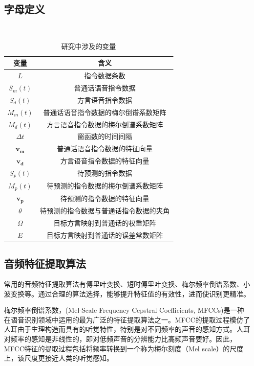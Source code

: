 \documentclass[lang=cn,cite=super]{elegantpaper}
\begin{document}
\subsection{字母定义}
\begin{table}[h]
    \caption{\label{tab:2} 研究中涉及的变量}\
    \begin{center}
        \begin{tabular}{cc}
            \hline
            \textbf{变量} & \textbf{含义}\\
            \hline \hline
            $L$ & 指令数据条数\\
            $S_m(t)$ & 普通话语音指令数据\\
            $S_d(t)$ & 方言语音指令数据\\
            $M_m(t)$ & 普通话语音指令数据的梅尔倒谱系数矩阵\\
            $M_d(t)$ & 方言语音指令数据的梅尔倒谱系数矩阵\\
            $\Delta t$ & 窗函数的时间间隔\\
            $\bm{v_m}$ & 普通话语音指令数据的特征向量\\
            $\bm{v_d}$ & 方言语音指令数据的特征向量\\
            $S_p(t)$ & 待预测的指令数据\\
            $M_p(t)$ & 待预测的指令数据的梅尔倒谱系数矩阵\\
            $\bm{v_p}$ & 待预测的指令数据的特征向量\\
            $\theta$ & 待预测的指令数据与普通话指令数据的夹角\\
            $\Omega$ & 目标方言映射到普通话的权重矩阵\\
            $E$ & 目标方言映射到普通话的误差常数矩阵\\
            \hline
        \end{tabular}
    \end{center}
\end{table}
\subsection{音频特征提取算法}
常用的音频特征提取算法有傅里叶变换、短时傅里叶变换、梅尔频率倒谱系数、小波变换等。通过合理的算法选择，能够提升特征值的有效性，进而使识别更精准。

梅尔频率倒谱系数，(Mel-Scale Frequency Cepstral Coefficients, MFCCs)是一种在语音识别领域中运用的最为广泛的特征提取算法之一。MFCC的提取过程模仿了人耳由于生理构造而具有的听觉特性，特别是对不同频率的声音的感知方式。人耳对频率的感知是非线性的，即对低频声音的分辨能力比高频声音要好。因此，MFCC特征的提取过程包括将频率转换到一个称为梅尔刻度（Mel scale）的尺度上，该尺度更接近人类的听觉感知。
\end{document}
